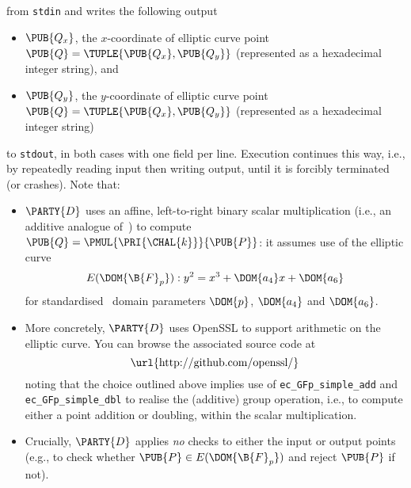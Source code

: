 \documentclass[crop={false},multi={true},tikz={true}]{standalone}
\begin{document}
\noindent
from \lstinline[language={bash}]{stdin} and writes the following output

\begin{itemize}
\item $\PUB{Q_x}$,
      the $x$-coordinate of elliptic curve point $\PUB{Q} = \TUPLE{ \PUB{Q_x}, \PUB{Q_y} }$
      (represented as a  hexadecimal integer string),      
      and
\item $\PUB{Q_y}$,
      the $y$-coordinate of elliptic curve point $\PUB{Q} = \TUPLE{ \PUB{Q_x}, \PUB{Q_y} }$
      (represented as a  hexadecimal integer string)
\end{itemize}

\noindent
to \lstinline[language={bash}]{stdout}, in both cases with one field per 
line.  Execution continues this way, i.e., by repeatedly reading input 
then writing output, until it is forcibly terminated (or crashes).  
Note that:

\begin{itemize}
\item $\PARTY{D}$ uses an affine, left-to-right binary scalar multiplication
      (i.e., an additive analogue of~\cite[Section 2.1]{SCALE:Gordon:85}) to 
      compute $\PUB{Q} = \PMUL{\PRI{\CHAL{k}}}{\PUB{P}}$: it assumes use of 
      the
       elliptic curve
      \[
      E( \DOM{\B{F}_p} ) : y^2 = x^3 + \DOM{a_4} x + \DOM{a_6}
      \]
      for standardised~\cite{SCALE:FIPS:186:00} domain parameters $\DOM{p}$, 
      $\DOM{a_4}$ and $\DOM{a_6}$.
\item More concretely, $\PARTY{D}$ uses OpenSSL to support arithmetic on the
      elliptic curve.  You can browse the associated source code at
      \[
      \mbox{\url{http://github.com/openssl/}}
      \]
      noting that the choice outlined above implies use of 
      \lstinline[language={C}]{ec_GFp_simple_add}
      and
      \lstinline[language={C}]{ec_GFp_simple_dbl}
      to realise the (additive) group operation, i.e., to compute either a
      point addition or doubling, within the scalar multiplication.
\item Crucially, $\PARTY{D}$ applies {\em no} checks to either the input or
      output points (e.g., to check whether 
      $
      \PUB{P} \in E( \DOM{\B{F}_p} )
      $ 
      and reject $\PUB{P}$ if not).
\end{itemize}
\end{document}
